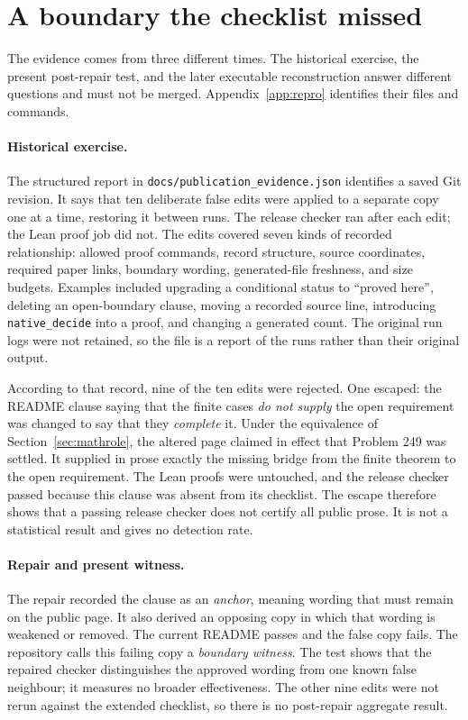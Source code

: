 \documentclass[11pt]{article}
\begin{document}
\section{A boundary the checklist missed}\label{sec:failure}

The evidence comes from three different times.  The historical exercise, the
present post-repair test, and the later executable reconstruction answer
different questions and must not be merged.  Appendix~\ref{app:repro} identifies
their files and commands.

\paragraph{Historical exercise.}
The structured report in \texttt{docs/publication\_evidence.json} identifies a
saved Git revision.  It says that ten deliberate false edits were applied to a
separate copy one at a time, restoring it between runs.  The release checker
ran after each edit; the Lean proof job did not.  The edits covered seven kinds
of recorded relationship: allowed proof commands, record structure, source
coordinates, required paper links, boundary wording, generated-file freshness,
and size budgets.  Examples included
upgrading a conditional status to ``proved here'', deleting an open-boundary
clause, moving a recorded source line, introducing \texttt{native\_decide} into
a proof, and changing a generated count.  The original run logs were not retained,
so the file is a report of the runs rather than their original output.

According to that record, nine of the ten edits were rejected.  One escaped:
the README clause saying that the finite cases \emph{do not supply} the open
requirement was changed to say that they \emph{complete} it.  Under the
equivalence of Section~\ref{sec:mathrole}, the altered page claimed in effect
that Problem 249 was settled.  It supplied in prose exactly the missing bridge
from the finite theorem to the open requirement.  The Lean proofs were
untouched, and the release checker passed because this clause was absent from
its checklist.  The escape therefore shows that a passing release checker does
not certify all public prose.  It is not a statistical result
and gives no detection rate.

\paragraph{Repair and present witness.}
The repair recorded the clause as an \emph{anchor}, meaning wording that must
remain on the public page.  It also derived an opposing copy in which that
wording is weakened or removed.  The current README passes and the false copy
fails.  The repository calls this failing copy a \emph{boundary witness}.  The
test shows that the repaired checker distinguishes the approved wording from
one known false neighbour; it measures no broader effectiveness.  The other nine edits
were not rerun against the extended checklist, so there is no
post-repair aggregate result.
\end{document}
